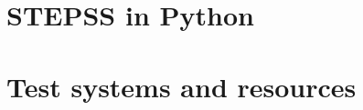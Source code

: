 \documentclass{sps-report}
\begin{document}



\part{STEPSS in Python}







\part{Test systems and resources}








\end{document}
